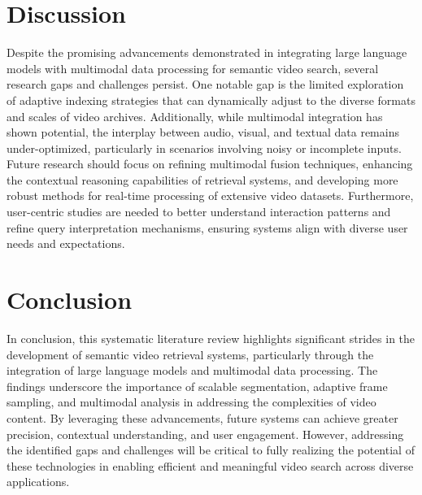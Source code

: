 \documentclass[conference]{IEEEtran}
\begin{document}
\section{Discussion}
Despite the promising advancements demonstrated in integrating large language models with multimodal data processing for semantic video search, several research gaps and challenges persist. One notable gap is the limited exploration of adaptive indexing strategies that can dynamically adjust to the diverse formats and scales of video archives. Additionally, while multimodal integration has shown potential, the interplay between audio, visual, and textual data remains under-optimized, particularly in scenarios involving noisy or incomplete inputs. Future research should focus on refining multimodal fusion techniques, enhancing the contextual reasoning capabilities of retrieval systems, and developing more robust methods for real-time processing of extensive video datasets. Furthermore, user-centric studies are needed to better understand interaction patterns and refine query interpretation mechanisms, ensuring systems align with diverse user needs and expectations.

\section{Conclusion}
In conclusion, this systematic literature review highlights significant strides in the development of semantic video retrieval systems, particularly through the integration of large language models and multimodal data processing. The findings underscore the importance of scalable segmentation, adaptive frame sampling, and multimodal analysis in addressing the complexities of video content. By leveraging these advancements, future systems can achieve greater precision, contextual understanding, and user engagement. However, addressing the identified gaps and challenges will be critical to fully realizing the potential of these technologies in enabling efficient and meaningful video search across diverse applications.
\end{document}
